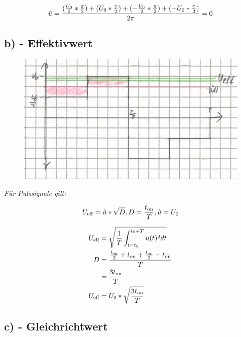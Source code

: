 \documentclass[../../document.tex]{subfiles}
\begin{document}
\[\bar{u} = \frac{ ( \frac{U_{\textrm{0}}}{2} * \frac{\pi}{2} ) + (U_{\textrm{0}} * \frac{\pi}{2}) + (-\frac{U_{\textrm{0}}}{2} * \frac{\pi}{2}) + (-U_{\textrm{0}} * \frac{\pi}{2}) }{2\pi} = 0\]

\newpage

\subsection*{b) - Effektivwert}

\begin{figure}[H]
    \begin{center}
        \includegraphics[width=.9\linewidth]{../../img/aufg6-b}
    \end{center}
\end{figure}

\emph{Für Pulssignale gilt:}

\[U_{\textrm{eff}} = \hat{u} * \sqrt{D}, D = \frac{t_{\textrm{on}}}{T}, \hat{u} = U_{\textrm{0}}\]

\begin{equation*}
    \begin{split}
        U_{\textrm{eff}} &= \sqrt{\frac{1}{T} \int_{t=t_{\textrm{0}}}^{t_{\textrm{0}} + T} u(t)^2 dt}\\
        D &= \frac{\frac{t_{\textrm{on}}}{2} + t_{\textrm{on}} + \frac{t_{\textrm{on}}}{2} + t_{\textrm{on}}}{T}\\
        &= \frac{3t_{\textrm{on}}}{T}\\
        U_{\textrm{eff}} &= U_{\textrm{0}} * \sqrt{\frac{3t_{\textrm{on}}}{T}}\\
    \end{split}
\end{equation*}

\subsection*{c) - Gleichrichtwert}
\end{document}
